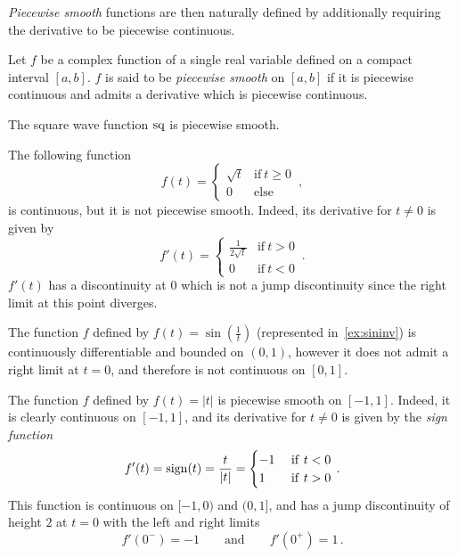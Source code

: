 \emph{Piecewise smooth} functions are then naturally defined by additionally requiring the
derivative to be piecewise continuous.
\begin{definition}
	\label{def:pw-smooth}
	Let $f$ be a complex function of a single real variable defined on a compact interval
	$[a,b]$. $f$ is said to be \emph{piecewise smooth} on $[a,b]$ if it is piecewise
	continuous and admits a derivative which is piecewise continuous.
\end{definition}
\begin{example}
	The square wave function $\operatorname{sq}$ is piecewise smooth.
\end{example}
\begin{example}
	The following function
	\begin{equation}
		f(t)=
		\begin{cases}
			\sqrt{t} & \text{if}~t\geq 0 \\
			0        & \text{else}
		\end{cases}\,,
	\end{equation}
	is continuous, but it is not piecewise smooth. Indeed, its derivative for $t\neq 0$ is
	given by
	\begin{equation}
		f'(t)=
		\begin{cases}
			\frac{1}{2\sqrt{t}} & \text{if}~t>0 \\
			0                   & \text{if}~t<0
		\end{cases}\,.
	\end{equation}
	$f'(t)$ has a discontinuity at $0$ which is not a jump discontinuity since the right
	limit at this point diverges.
\end{example}
\begin{example}
	\label{ex:sininv}
	The function $f$ defined by $f(t)=\sin(\frac{1}{t})$ (represented in~\cref{ex:sininv})
	is continuously differentiable and bounded on $(0,1)$, however it does not admit a right
	limit at $t=0$, and therefore is not continuous on $[0,1]$.
\end{example}
\begin{example}
	The function $f$ defined by $f(t)=|t|$ is piecewise smooth on $[-1,1]$. Indeed, it is
	clearly continuous on $[-1,1]$, and its derivative for $t\neq 0$ is given by the
	\emph{sign function}
	\begin{equation}
		f'(t)=\operatorname{sign}(t)=\frac{t}{|t|}=
		\begin{cases}
			-1 & ~\mathrm{if}~t<0 \\
			1  & ~\mathrm{if}~t>0
		\end{cases}\,.
	\end{equation}
	This function is continuous on $[-1,0)$ and $(0,1]$, and has a jump discontinuity of
	height $2$ at $t=0$ with the left and right limits
	\begin{equation}
		f'(0^-)=-1\qquad\text{and}\qquad f'(0^+)=1\,.
	\end{equation}
\end{example}
